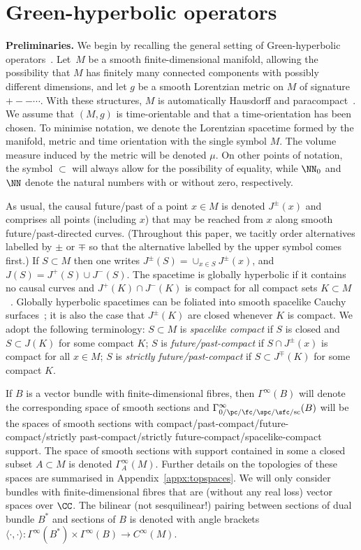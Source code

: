 \section{Green-hyperbolic operators}\label{sec:GHOs}

{\bf Preliminaries.}
 We begin by recalling the general setting of Green-hyperbolic operators~\cite{Baer:2015}. Let~$M$ be a smooth finite-dimensional manifold, allowing the possibility that $M$ has finitely many connected components with possibly different dimensions, and let $g$ be a smooth Lorentzian metric on $M$ of signature $+--\cdots$. With these structures, $M$ is automatically Hausdorff and paracompact~\cite{Geroch_spinorI:1968}.
 We assume that $(M,g)$ is time-orientable and that a time-orientation has been chosen. To minimise notation, we denote the Lorentzian spacetime formed by the manifold, metric and time orientation with the single symbol $M$. The volume measure induced by the metric will be denoted $\mu$. On other points of notation,
 the symbol $\subset$ will always allow for the possibility of equality, while $\NN_0$ and $\NN$ denote the natural numbers with or without zero, respectively.

 As usual, the causal future/past of a point $x\in M$ is denoted $J^\pm(x)$ and comprises all points (including $x$) that may be reached from $x$ along smooth future/past-directed curves. (Throughout this paper, we tacitly order alternatives labelled by $\pm$ or $\mp$ so that the alternative labelled by the upper symbol comes first.)
 If $S\subset M$ then one writes $J^\pm(S)=\cup_{x\in S} J^\pm(x)$, and $J(S)=J^+(S)\cup J^-(S)$. The spacetime is globally hyperbolic if it contains no causal curves and $J^+(K)\cap J^-(K)$ is compact for all compact sets $K\subset M$~\cite{Bernal:2006xf}. Globally hyperbolic spacetimes can be foliated into smooth spacelike Cauchy surfaces~\cite{Bernal:2004gm}; it is also the case that $J^\pm(K)$ are closed whenever $K$ is compact. We adopt the following terminology: $S\subset M$ is
 \emph{spacelike compact} if $S$ is closed and $S\subset J(K)$ for some compact $K$; $S$ is \emph{future/past-compact} if $S\cap J^{\pm}(x)$ is compact for all $x\in M$; $S$ is \emph{strictly future/past-compact} if
 $S\subset J^{\mp}(K)$ for some compact $K$.

 If $B$ is a vector bundle with finite-dimensional fibres, then $\Gamma^\infty(B)$ will denote the corresponding space of smooth sections and $\Gamma_{0/\pc/\fc/\spc/\sfc/\mathrm{sc}}^\infty(B)$ will be the spaces of smooth sections with com\-pact/past-compact/future-compact/strictly past-compact/strictly future-compact/space\-li\-ke-compact support. The space of smooth sections with support contained in some a closed subset $A\subset M$ is denoted $\Gamma^\infty_A(M)$. Further details on the topologies of these spaces are summarised in Appendix~\ref{appx:topspaces}. We will only consider bundles with finite-dimensional fibres that are (without any real loss) vector spaces over $\CC$. The bilinear (not sesquilinear!) pairing between sections of dual bundle $B^*$ and sections of $B$ is denoted with angle brackets $\langle \cdot,\cdot\rangle \colon \Gamma^\infty(B^*)\times \Gamma^\infty(B)\to C^\infty(M)$.

